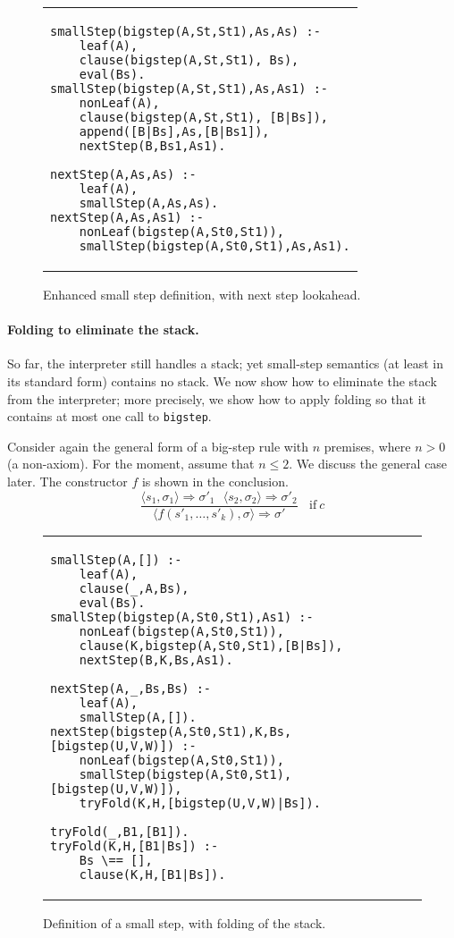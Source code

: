 \documentclass{llncs}
\begin{document}
\begin{figure}
\begin{tabular}{l}
\begin{lstlisting}
smallStep(bigstep(A,St,St1),As,As) :- 
    leaf(A),
    clause(bigstep(A,St,St1), Bs),
    eval(Bs).
smallStep(bigstep(A,St,St1),As,As1) :- 
    nonLeaf(A),
    clause(bigstep(A,St,St1), [B|Bs]),
    append([B|Bs],As,[B|Bs1]),
    nextStep(B,Bs1,As1).
    
nextStep(A,As,As) :-
    leaf(A),
    smallStep(A,As,As).
nextStep(A,As,As1) :-
    nonLeaf(bigstep(A,St0,St1)),
    smallStep(bigstep(A,St0,St1),As,As1).
\end{lstlisting}
\end{tabular}
\caption{Enhanced small step definition, with next step lookahead.}\label{fig:linear-nextstep}
\end{figure}

\paragraph{Folding to eliminate the stack.}  So far, the interpreter still handles a stack; yet small-step semantics (at least in its standard form)
contains no stack.  We now show how to eliminate the stack from the interpreter;  more precisely, we show how to apply folding so that it
contains at most one call to \texttt{bigstep}.

Consider again the general form of a big-step rule with $n$ premises, where $n>0$ (a non-axiom).  For the moment,
assume that $n\le 2$.  We discuss the general case later. The constructor $f$ is shown in
the conclusion.  
\[
\dfrac{\langle s_1, \sigma_1\rangle \Longrightarrow \sigma'_1 ~~~\langle s_2, \sigma_2\rangle \Longrightarrow \sigma'_2}
{\langle f(s'_1,\ldots,s'_k), \sigma\rangle \Longrightarrow \sigma'} 
~~~~\mathrm{if }~ c
\]

\begin{figure}
\begin{tabular}{l}
\begin{lstlisting}
smallStep(A,[]) :-
	leaf(A),
	clause(_,A,Bs),
	eval(Bs).
smallStep(bigstep(A,St0,St1),As1) :-
	nonLeaf(bigstep(A,St0,St1)),
	clause(K,bigstep(A,St0,St1),[B|Bs]),
	nextStep(B,K,Bs,As1).
	
nextStep(A,_,Bs,Bs) :-
	leaf(A),
	smallStep(A,[]).
nextStep(bigstep(A,St0,St1),K,Bs,[bigstep(U,V,W)]) :-
	nonLeaf(bigstep(A,St0,St1)),
	smallStep(bigstep(A,St0,St1),[bigstep(U,V,W)]),
	tryFold(K,H,[bigstep(U,V,W)|Bs]).
	
tryFold(_,B1,[B1]).
tryFold(K,H,[B1|Bs]) :-
	Bs \== [],
	clause(K,H,[B1|Bs]).
\end{lstlisting}
\end{tabular}
\caption{Definition of a small step, with folding of the stack.}\label{fig:linear-fold}
\end{figure}
\end{document}
